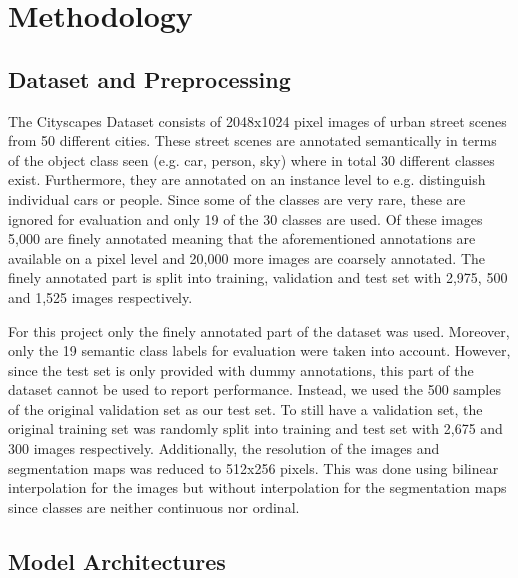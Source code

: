 \documentclass{article}
\begin{document}
\section{Methodology}
\label{sec:methodology}
\subsection{Dataset and Preprocessing}
The Cityscapes Dataset \autocite{Cordts2016Cityscapes} consists of 2048x1024 
pixel images of urban street scenes from 50 different cities. These street 
scenes are annotated semantically in terms of the object class seen (e.g. 
car, person, sky) where in total 30 different classes exist. Furthermore, they 
are annotated on an instance level to e.g. distinguish individual cars or 
people. Since some of the classes are very rare, these are ignored for 
evaluation and only 19 of the 30 classes are used. Of these images 5,000 are 
finely annotated meaning that the aforementioned annotations are available on a 
pixel level and 20,000 more images are coarsely annotated. The finely annotated 
part is split into training, validation and test set with 2,975, 500 and 1,525 
images respectively. \autocite{Cordts2016Cityscapes}

For this project only the finely annotated part of the dataset was used. 
Moreover, only the 19 semantic class labels for evaluation were taken into 
account.
However, since the test set is only provided with dummy annotations, this 
part of the dataset cannot be used to report performance. Instead, we used the 
500 samples of the original validation set as our test set. To still have a 
validation set, the original training set was randomly split into training and 
test set with 2,675 and 300 images respectively. Additionally, the resolution 
of the images and segmentation maps was reduced to 512x256 pixels. This was 
done using bilinear interpolation for the images but without interpolation for 
the segmentation maps since classes are neither continuous nor ordinal.
\subsection{Model Architectures}
\end{document}

